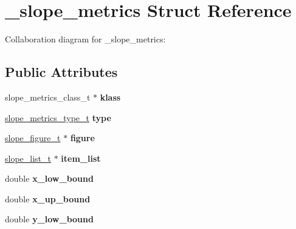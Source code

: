 \hypertarget{struct__slope__metrics}{\section{\+\_\+slope\+\_\+metrics Struct Reference}
\label{struct__slope__metrics}
}


Collaboration diagram for \+\_\+slope\+\_\+metrics\+:
\subsection*{Public Attributes}
\begin{DoxyCompactItemize}
\item 
\hypertarget{struct__slope__metrics_ac0be13f740c34881ef12ee711d02c4ab}{slope\+\_\+metrics\+\_\+class\+\_\+t $\ast$ {\bfseries klass}}\label{struct__slope__metrics_ac0be13f740c34881ef12ee711d02c4ab}

\item 
\hypertarget{struct__slope__metrics_a3aa8ff6d674059c26e68980d6196d655}{\hyperlink{group__Metrics_ga5f51fc24807a4b3d2b0d41f354bbcedf}{slope\+\_\+metrics\+\_\+type\+\_\+t} {\bfseries type}}\label{struct__slope__metrics_a3aa8ff6d674059c26e68980d6196d655}

\item 
\hypertarget{struct__slope__metrics_a90f058e9225cd913f585c36739f95901}{\hyperlink{group__Figure_ga507cc82eeca8255d6c0f603ffdaeb59e}{slope\+\_\+figure\+\_\+t} $\ast$ {\bfseries figure}}\label{struct__slope__metrics_a90f058e9225cd913f585c36739f95901}

\item 
\hypertarget{struct__slope__metrics_a0a920646d930ff607bb8fc954b1cafbc}{\hyperlink{group__List_ga88326d377deca937191acac6784bff0e}{slope\+\_\+list\+\_\+t} $\ast$ {\bfseries item\+\_\+list}}\label{struct__slope__metrics_a0a920646d930ff607bb8fc954b1cafbc}

\item 
\hypertarget{struct__slope__metrics_aa91b6061f72089b60903d8310d691464}{double {\bfseries x\+\_\+low\+\_\+bound}}\label{struct__slope__metrics_aa91b6061f72089b60903d8310d691464}

\item 
\hypertarget{struct__slope__metrics_a04c15859cae09965d4608144f87016c2}{double {\bfseries x\+\_\+up\+\_\+bound}}\label{struct__slope__metrics_a04c15859cae09965d4608144f87016c2}

\item 
\hypertarget{struct__slope__metrics_acdba84cfba06e6293e18ba29cc822e35}{double {\bfseries y\+\_\+low\+\_\+bound}}\label{struct__slope__metrics_acdba84cfba06e6293e18ba29cc822e35}


\end{DoxyCompactItemize}
